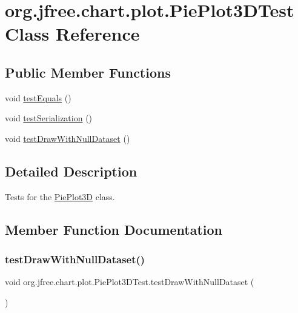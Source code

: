 \hypertarget{classorg_1_1jfree_1_1chart_1_1plot_1_1_pie_plot3_d_test}{}\section{org.\+jfree.\+chart.\+plot.\+Pie\+Plot3\+D\+Test Class Reference}
\label{classorg_1_1jfree_1_1chart_1_1plot_1_1_pie_plot3_d_test}
\subsection*{Public Member Functions}
\begin{DoxyCompactItemize}
\item 
void \mbox{\hyperlink{classorg_1_1jfree_1_1chart_1_1plot_1_1_pie_plot3_d_test_a25c8b56bef6b0cc98cf4babe2b0ea754}{test\+Equals}} ()
\item 
void \mbox{\hyperlink{classorg_1_1jfree_1_1chart_1_1plot_1_1_pie_plot3_d_test_adea65c99857121c9b36c02e29191322f}{test\+Serialization}} ()
\item 
void \mbox{\hyperlink{classorg_1_1jfree_1_1chart_1_1plot_1_1_pie_plot3_d_test_a957905bb993f97888cd5d50b3295f94f}{test\+Draw\+With\+Null\+Dataset}} ()
\end{DoxyCompactItemize}


\subsection{Detailed Description}
Tests for the \mbox{\hyperlink{classorg_1_1jfree_1_1chart_1_1plot_1_1_pie_plot3_d}{Pie\+Plot3D}} class. 

\subsection{Member Function Documentation}
\mbox{\label{classorg_1_1jfree_1_1chart_1_1plot_1_1_pie_plot3_d_test_a957905bb993f97888cd5d50b3295f94f}} 
\subsubsection{\texorpdfstring{test\+Draw\+With\+Null\+Dataset()}{testDrawWithNullDataset()}}
{\footnotesize\ttfamily void org.\+jfree.\+chart.\+plot.\+Pie\+Plot3\+D\+Test.\+test\+Draw\+With\+Null\+Dataset (\begin{DoxyParamCaption}{ }\end{DoxyParamCaption})}

